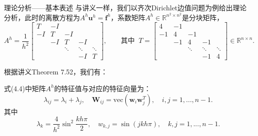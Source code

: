 \documentclass[9pt]{beamer}
\begin{document}
\begin{frame}{理论分析——基本表述}
  \small
  与讲义一样，我们以齐次Dirichlet边值问题为例给出理论分析，此时的离散方程为$A^h\mathbf{u}^h=\mathbf{f}^h$，系数矩阵$A^h\in\mathbb{R}^{n^2\times n^2}$是分块矩阵，
  \begin{equation*}
    A^h=\frac{1}{h^2}\begin{bmatrix}
      T & -I & \\
      -I & T & -I & \\
      & -I & T & -I &\\
      & & \ddots & \ddots & \ddots\\
      & & & -I & T
    \end{bmatrix},\qquad \text{其中}\;\;
    T=\begin{bmatrix}
      4 & -1 & \\
      -1 & 4 & -1 & \\
      & -1 & 4 & -1 &\\
      & & \ddots & \ddots & \ddots\\
      & & & -1 & 4
    \end{bmatrix}\in\mathbb{R}^{n\times n}.
  \end{equation*}
  
  根据讲义Theorem 7.52，我们有：
  \begin{theorem}
    \small
    式(4.4)中矩阵$A^h$的特征值与对应的特征向量为：
    \begin{equation}
      \lambda_{ij}=\lambda_i+\lambda_j,\quad \mathbf{W}_{ij}=\text{vec}(\mathbf{w}_i\mathbf{w}_j^T),\quad i,j=1,...,n-1.
    \end{equation}
    其中
    \begin{equation}
      \lambda_k=\frac{4}{h^2}\sin^2\frac{kh\pi}{2},\quad w_{k,j}=\sin(jkh\pi),\quad k,j=1,...,n-1.
    \end{equation}
  \end{theorem}
\end{frame}
\end{document}
